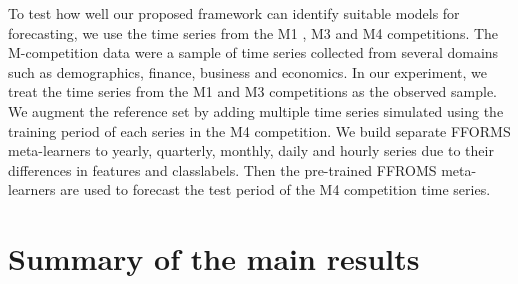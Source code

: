 \documentclass[11pt,a4paper,]{article}
\begin{document}
To test how well our proposed framework can identify suitable models for forecasting, we use the time series from the M1 \autocite{makridakis1982accuracy}, M3 \autocite{makridakis2000m3} and M4 \autocite{makridakis2019m4} competitions. The M-competition data were a sample of time series collected from several domains such as demographics, finance, business and economics. In our experiment, we treat the time series from the M1 and M3 competitions as the observed sample. We augment the reference set by adding multiple time series simulated using the training period of each series in the M4 competition. We build separate FFORMS meta-learners to yearly, quarterly, monthly, daily and hourly series due to their differences in features and classlabels. Then the pre-trained FFROMS meta-learners are used to forecast the test period of the M4 competition time series.

\hypertarget{results}{%
\section{Summary of the main results}\label{results}}
\end{document}
